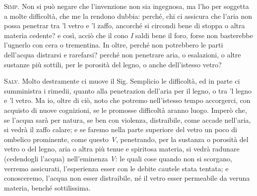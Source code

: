\documentclass[11pt,twoside,openany]{book}
\newcommand{\speaker}[1]{\textcolor{rubric}{\textsc{#1}}\space}
\begin{document}
\speaker{Simp.} Non si può negare che l'invenzione non sia ingegnosa, ma l'ho per soggetta a molte difficoltà, che me la rendono dubbia: perché, chi ci assicura che l'aria non possa penetrar tra 'l vetro e 'l zaffo, ancorché si circondi bene di stoppa o altra materia cedente? e così, acciò che il cono \emph{I} saldi bene il foro, forse non basterebbe l'ugnerlo con cera o trementina. In oltre, perché non potrebbero le parti dell'acqua distrarsi e rarefarsi? perché non penetrare aria, o esalazioni, o altre sustanze più sottili, per le porosità del legno, o anche dell'istesso vetro?

\speaker{Salv.} Molto destramente ci muove il Sig. Semplicio le difficoltà, ed in parte ci sumministra i rimedii, quanto alla penetrazion dell'aria per il legno, o tra 'l legno e 'l vetro. Ma io, oltre di ciò, noto che potremo nell'istesso tempo accorgerci, con acquisto di nuove cognizioni, se le promosse difficoltà aranno luogo. Imperò che, se l'acqua sarà per natura, se ben con violenza, distraibile, come accade nell'aria, si vedrà il zaffo calare; e se faremo nella parte superiore del vetro un poco di ombelico prominente, come questo \emph{V}, penetrando, per la sustanza o porosità del vetro o del legno, aria o altra più tenue e spiritosa materia, si vedrà radunare (cedendogli l'acqua) nell'eminenza \emph{V}: le quali cose quando non si scorgano, verremo assicurati, l'esperienza esser con le debite cautele stata tentata; e conosceremo, l'acqua non esser distraibile, né il vetro esser permeabile da veruna materia, benché sottilissima.
\end{document}
